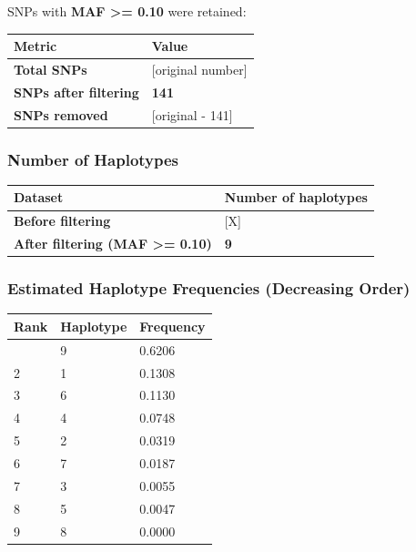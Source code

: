 \documentclass[
]{article}
\newcounter{none} %
\begin{document}
SNPs with \textbf{MAF \textgreater= 0.10} were retained:

{\def\LTcaptype{none} %
\begin{longtable}[]{@{}ll@{}}
\toprule\noalign{}
Metric & Value \\
\midrule\noalign{}
\endhead
\bottomrule\noalign{}
\endlastfoot
\textbf{Total SNPs} & {[}original number{]} \\
\textbf{SNPs after filtering} & \textbf{141} \\
\textbf{SNPs removed} & {[}original - 141{]} \\
\end{longtable}
}

\subsubsection{Number of Haplotypes}\label{number-of-haplotypes}

{\def\LTcaptype{none} %
\begin{longtable}[]{@{}ll@{}}
\toprule\noalign{}
Dataset & Number of haplotypes \\
\midrule\noalign{}
\endhead
\bottomrule\noalign{}
\endlastfoot
\textbf{Before filtering} & {[}X{]} \\
\textbf{After filtering (MAF \textgreater= 0.10)} & \textbf{9} \\
\end{longtable}
}

\subsubsection{Estimated Haplotype Frequencies (Decreasing
Order)}\label{estimated-haplotype-frequencies-decreasing-order}

{\def\LTcaptype{none} %
\begin{longtable}[]{@{}lll@{}}
\toprule\noalign{}
Rank & Haplotype & Frequency \\
\midrule\noalign{}
\endhead
\bottomrule\noalign{}
\endlastfoot
1 & 9 & 0.6206 \\
2 & 1 & 0.1308 \\
3 & 6 & 0.1130 \\
4 & 4 & 0.0748 \\
5 & 2 & 0.0319 \\
6 & 7 & 0.0187 \\
7 & 3 & 0.0055 \\
8 & 5 & 0.0047 \\
9 & 8 & 0.0000 \\
\end{longtable}
}
\end{document}
